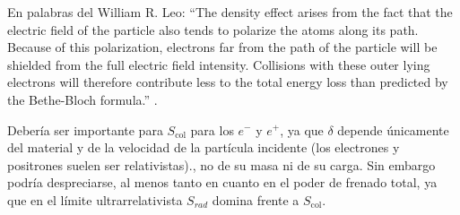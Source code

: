 \begin{enumerate}[label=\alph*)]
    En palabras del William R. Leo: ``The density effect arises from the fact that the electric field of the particle also tends  to polarize the atoms along its path. Because of this polarization, electrons far from the  path of the particle will be shielded from the full electric field intensity. Collisions with  these outer lying electrons will therefore contribute less to the total energy loss than  predicted by the Bethe-Bloch formula.'' \cite{Leo1994}.

    Debería ser importante para $S_{\text{col}}$ para los $e^-$ y $e^+$, ya que $\delta$ depende únicamente del material y de la velocidad de la partícula incidente (los electrones y positrones suelen ser relativistas)., no de su masa ni de su carga. Sin embargo podría despreciarse, al menos tanto en cuanto en el poder de frenado total, ya que en el límite ultrarrelativista $S_{rad}$ domina frente a $S_{\text{col}}$.


\end{enumerate}
